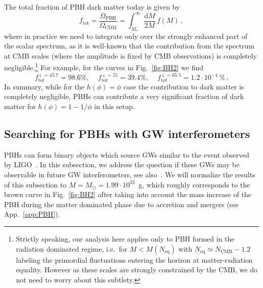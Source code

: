 The total fraction of PBH dark matter today is given by
\begin{equation}
f_\text{tot} = \frac{\Omega_{\text{PBH}}}{\Omega_{\text{CDM}}} = \int_{M_*}^\infty \frac{\textrm{d} M}{2 M}  \, f(M) \,,
\end{equation}
where in practice we need to integrate only over the strongly enhanced part of the scalar spectrum, as it is well-known that the contribution from the spectrum at CMB scales (where the amplitude is fixed by CMB observations) is completely negligible.\footnote{Strictly speaking, our analysis here applies only to PBH formed in the radiation dominated regime, i.e.\ for $M < M(N_\text{eq})$ with $N_\text{eq} \simeq N_\text{CMB} - 1.2$ labeling the primordial fluctuations entering the horizon at matter-radiation equality. However as these scales are strongly constrained by the CMB, we do not need to worry about this subtlety.} For example, for the curves in Fig.~\ref{fig:BH2} we find 
\begin{equation}
f_\text{tot}^{\varsigma = 45.7} = 98.6 \%,  \, \quad f_\text{tot}^{\varsigma = 55} = 39.4 \% , \, \quad f_\text{tot}^{\varsigma = 65.5} = 1.2 \cdot 10^{-4} \, \% \,.
\end{equation}
In summary, while for the $h(\phi) = \phi$ case the contribution to dark matter is completely negligible, PBHs can contribute a very significant fraction of dark matter for $h(\phi) = 1 - 1/\phi$ in this setup.

\subsection{Searching for PBHs with GW interferometers \label{app:GWs}}

PBHs can form binary objects which source GWs similar to the event observed by LIGO~\cite{Abbott:2016blz}. In this subsection, we address the question if these GWs may be observable in future GW interferometers, see also~\cite{Garcia-Bellido:2017fdg}.  We will normalize the results of this subsection to $M = M_\odot = 1.99 \cdot 10^{33}$~g, which roughly corresponds to the brown curve in Fig.~\ref{fig:BH2} after taking into account the mass increase of the PBH during the matter dominated phase due to accretion and mergers (see App.~\ref{app:PBH}).

